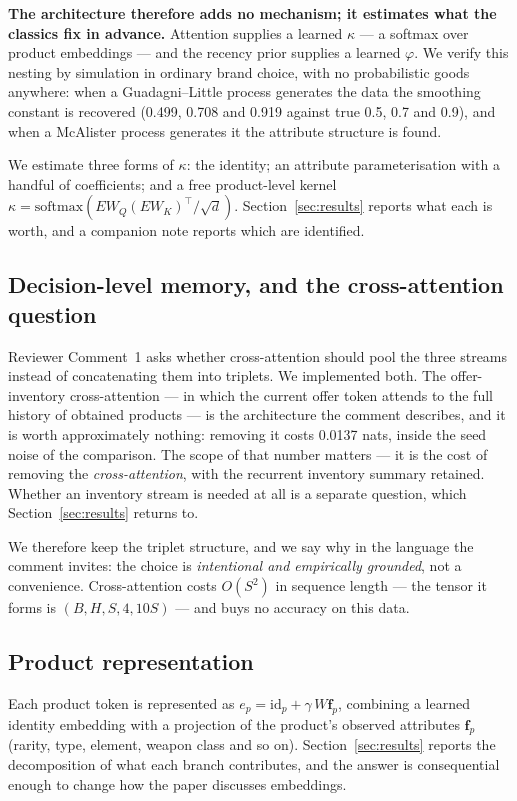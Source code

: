 \documentclass[11pt]{article}
\begin{document}
\noindent\textbf{The architecture therefore adds no mechanism; it estimates what
the classics fix in advance.} Attention supplies a learned $\kappa$ --- a
softmax over product embeddings --- and the recency prior supplies a learned
$\varphi$. We verify this nesting by simulation in ordinary brand choice, with
no probabilistic goods anywhere: when a Guadagni--Little process generates the
data the smoothing constant is recovered (0.499, 0.708 and 0.919 against true
0.5, 0.7 and 0.9), and when a McAlister process generates it the attribute
structure is found.

We estimate three forms of $\kappa$: the identity; an attribute
parameterisation with a handful of coefficients; and a free product-level kernel
$\kappa=\mathrm{softmax}(EW_Q(EW_K)^\top/\sqrt{d})$. Section~\ref{sec:results}
reports what each is worth, and a companion note reports which are identified.

\subsection*{Decision-level memory, and the cross-attention question}

Reviewer Comment~1 asks whether cross-attention should pool the three streams
instead of concatenating them into triplets. We implemented both. The
offer-inventory cross-attention --- in which the current offer token attends to
the full history of obtained products --- is the architecture the comment
describes, and it is worth approximately nothing: removing it costs 0.0137 nats,
inside the seed noise of the comparison. The scope of that number matters --- it
is the cost of removing the \emph{cross-attention}, with the recurrent inventory
summary retained. Whether an inventory stream is needed at all is a separate
question, which Section~\ref{sec:results} returns to.

We therefore keep the triplet structure, and we say why in the language the
comment invites: the choice is \emph{intentional and empirically grounded},
not a convenience. Cross-attention costs $O(S^2)$ in sequence length --- the
tensor it forms is $(B,H,S,4,10S)$ --- and buys no accuracy on this data.

\subsection*{Product representation}

Each product token is represented as $e_p=\mathrm{id}_p+\gamma\,W\mathbf{f}_p$,
combining a learned identity embedding with a projection of the product's
observed attributes $\mathbf{f}_p$ (rarity, type, element, weapon class and
so on). Section~\ref{sec:results} reports the decomposition of what each branch
contributes, and the answer is consequential enough to change how the paper
discusses embeddings.
\end{document}
